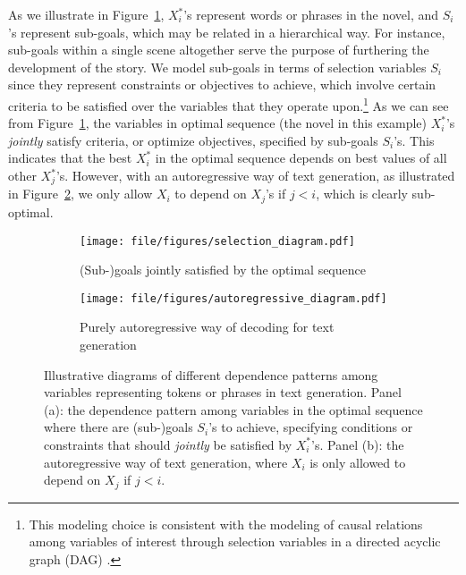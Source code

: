 As we illustrate in Figure~\ref{fig:comparison:selection}, $X_i^*$'s represent words or phrases in the novel, and $S_i$'s represent sub-goals, which may be related in a hierarchical way.
For instance, sub-goals within a single scene altogether serve the purpose of furthering the development of the story.
We model sub-goals in terms of selection variables $S_i$ since they represent constraints or objectives to achieve, which involve certain criteria to be satisfied over the variables that they operate upon.\footnote{
    This modeling choice is consistent with the modeling of causal relations among variables of interest through selection variables in a directed acyclic graph (DAG) \citep{spirtes1993causation,pearl2009causality}.
}
As we can see from Figure~\ref{fig:comparison:selection}, the variables in optimal sequence (the novel in this example) $X_i^*$'s \emph{jointly} satisfy criteria, or optimize objectives, specified by sub-goals $S_i$'s.
This indicates that the best $X_i^*$ in the optimal sequence depends on best values of all other $X_j^*$'s.
However, with an autoregressive way of text generation, as illustrated in Figure~\ref{fig:comparison:autoregressive}, we only allow $X_i$ to depend on $X_j$'s if $j < i$, which is clearly sub-optimal.

\begin{figure}[t]
    \centering
    \begin{subfigure}{.48\columnwidth}
        \centering
        \texttt{[image: file/figures/selection\_diagram.pdf]}
        \caption{\small
            (Sub-)goals jointly satisfied by the optimal sequence}
        \label{fig:comparison:selection}
    \end{subfigure}
    \hfill
    \begin{subfigure}[b]{.48\columnwidth}
        \centering
        \texttt{[image: file/figures/autoregressive\_diagram.pdf]}
        \caption{\small
            Purely autoregressive way of decoding for text generation}
        \label{fig:comparison:autoregressive}
    \end{subfigure}
    \caption{\small
        Illustrative diagrams of different dependence patterns among variables representing tokens or phrases in text generation.
        Panel (a): the dependence pattern among variables in the optimal sequence where there are (sub-)goals $S_i$'s to achieve, specifying conditions or constraints that should \emph{jointly} be satisfied by $X_i^*$'s.
        Panel (b): the autoregressive way of text generation, where $X_i$ is only allowed to depend on $X_j$ if $j < i$.
    }
    \label{fig:comparison}
    \vspace{-3ex}
\end{figure}

